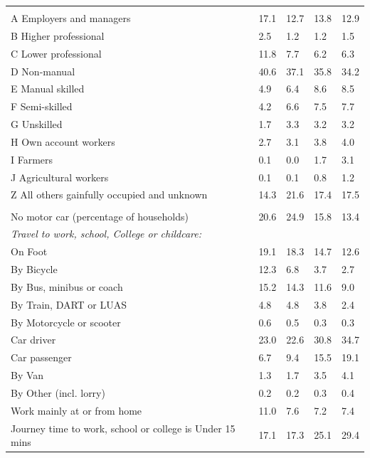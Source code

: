 \documentclass{article}
\begin{document}
\begin{table}[h]
\begin{tabular}{KTTTT}
\hline
    \\ 
    \hline
A Employers and managers & 17.1& 12.7& 13.8& 12.9\\
B Higher professional & 2.5& 1.2& 1.2& 1.5\\
C Lower professional & 11.8&  7.7&  6.2&  6.3\\
D Non-manual & 40.6& 37.1& 35.8& 34.2\\
E Manual skilled & 4.9& 6.4& 8.6& 8.5\\
F Semi-skilled & 4.2& 6.6& 7.5& 7.7\\
G Unskilled & 1.7& 3.3& 3.2& 3.2\\
H Own account workers & 2.7& 3.1& 3.8& 4.0\\
I Farmers & 0.1& 0.0& 1.7& 3.1\\
J Agricultural workers & 0.1& 0.1& 0.8& 1.2\\
Z All others gainfully occupied and unknown & 14.3& 21.6& 17.4& 17.5\\
\hline
{}\hline
    \\ 
    \hline
No motor car (percentage of households) & 20.6& 24.9& 15.8& 
13.4\\
    \hline 
\emph{Travel to work, school, College or childcare:} & & & \\
\quad On Foot & 19.1& 18.3& 14.7& 12.6\\ 
\quad By Bicycle & 12.3&  6.8&  3.7&  2.7\\ 
\quad By Bus, minibus or coach & 15.2& 14.3& 11.6&  9.0\\
\quad By Train, DART or LUAS & 4.8& 4.8& 3.8& 2.4\\
\quad By Motorcycle or scooter & 0.6& 0.5& 0.3& 0.3\\
\quad Car driver & 23.0 & 22.6& 30.8& 34.7\\
\quad Car passenger &  6.7&  9.4& 15.5& 19.1\\
\quad By Van & 1.3& 1.7& 3.5& 4.1\\
\quad By Other (incl. lorry) & 0.2& 0.2& 0.3& 0.4\\
    \hline
Work mainly at or from home & 11.0&  7.6&  7.2&  7.4\\
Journey time to work, school or college is Under 15 mins & 17.1& 17.3& 25.1& 29.4\\

\end{tabular}
\end{table}
\end{document}
